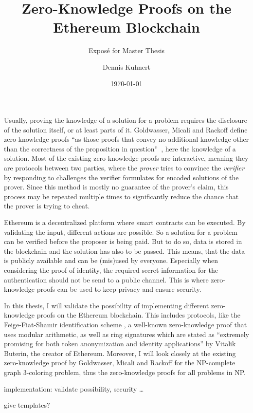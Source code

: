 \documentclass[a4paper,parskip=half]{scrartcl}
\title{Zero-Knowledge Proofs on the Ethereum Blockchain}
\subtitle{Exposé for Master Thesis}
\author{Dennis Kuhnert}
\date{\today}
\begin{document}
\maketitle

Usually, proving the knowledge of a solution for a problem requires the disclosure of the solution itself, or at least parts of it.
Goldwasser, Micali and Rackoff define zero-knowledge proofs ``as those proofs that convey no additional knowledge other than the correctness of the proposition in question''~\cite{goldwasser1989knowledge}, here the knowledge of a solution.
Most of the existing zero-knowledge proofs are interactive, meaning they are protocols between two parties, where the \emph{prover} tries to convince the \emph{verifier} by responding to challenges the verifier formulates for encoded solutions of the prover.
Since this method is mostly no guarantee of the prover's claim, this process may be repeated multiple times to significantly reduce the chance that the prover is trying to cheat.

Ethereum is a decentralized platform where smart contracts can be executed.
By validating the input, different actions are possible.
So a solution for a problem can be verified before the proposer is being paid.
But to do so, data is stored in the blockchain and the solution has also to be passed.
This means, that the data is publicly available and can be (mis)used by everyone.
Especially when considering the proof of identity, the required secret information for the authentication should not be send to a public channel.
This is where zero-knowledge proofs can be used to keep privacy and ensure security.

In this thesis, I will validate the possibility of implementing different zero-knowledge proofs on the Ethereum blockchain.
This includes protocols, like the Feige-Fiat-Shamir identification scheme \cite{feige1988zero}, a well-known zero-knowledge proof that uses modular arithmetic, as well as 
ring signatures which are stated as ``extremely promising for both token anonymization and identity applications'' \cite{buterin2015public} by Vitalik Buterin, the creator of Ethereum.
Moreover, I will look closely at the existing zero-knowledge proof by Goldwasser, Micali and Rackoff \cite{goldreich1991proofs} for the NP-complete graph 3-coloring problem, thus the zero-knowledge proofs for all problems in NP.

implementation: validate possibility, security \dots

give templates?
\end{document}
